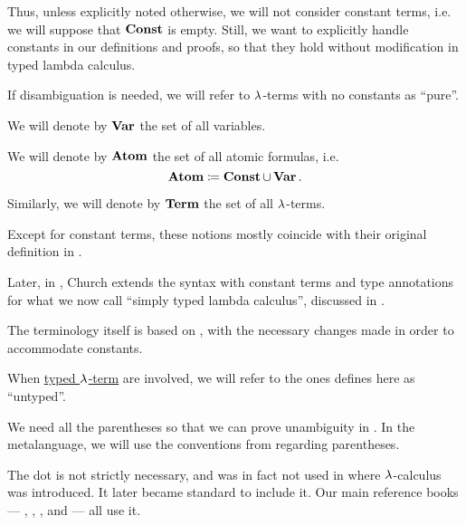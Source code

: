 \begin{definition}
\begin{thmenum}
    Thus, unless explicitly noted otherwise, we will not consider constant terms, i.e. we will suppose that \( \op*{Const} \) is empty. Still, we want to explicitly handle constants in our definitions and proofs, so that they hold without modification in typed lambda calculus.

    If disambiguation is needed, we will refer to \( \mathrm{\lambda} \)-terms with no constants as \enquote{pure}.

     We will denote by \( \op*{Var} \) the set of all variables.

     We will denote by \( \op*{Atom} \) the set of all atomic formulas, i.e.
    \begin{equation*}
      \op*{Atom} \coloneqq \op*{Const} \cup \op*{Var}.
    \end{equation*}

     Similarly, we will denote by \( \op*{Term} \) the set of all \( \mathrm{\lambda} \)-terms.
  \end{thmenum}
\end{definition}
\begin{comments}
  \item Except for constant terms, these notions mostly coincide with their original definition in \cite[352]{Church1932LambdaCalculus}.

  Later, in \cite[56]{Church1940STT}, Church extends the syntax with constant terms and type annotations for what we now call \enquote{simply typed lambda calculus}, discussed in .

  The terminology itself is based on \cite[def. 1A1]{Hindley1997BasicSTT}, with the necessary changes made in order to accommodate constants.

  \item When \hyperref[def:typed_lambda_term]{typed \( \mathrm{\lambda} \)-term} are involved, we will refer to the ones defines here as \enquote{untyped}.

  \item We need all the parentheses so that we can prove unambiguity in . In the metalanguage, we will use the conventions from  regarding parentheses.

  \item The dot is not strictly necessary, and was in fact not used in  where \( \mathrm{\lambda} \)-calculus was introduced. It later became standard to include it. Our main reference books --- , , ,  and  --- all use it.
\end{comments}

